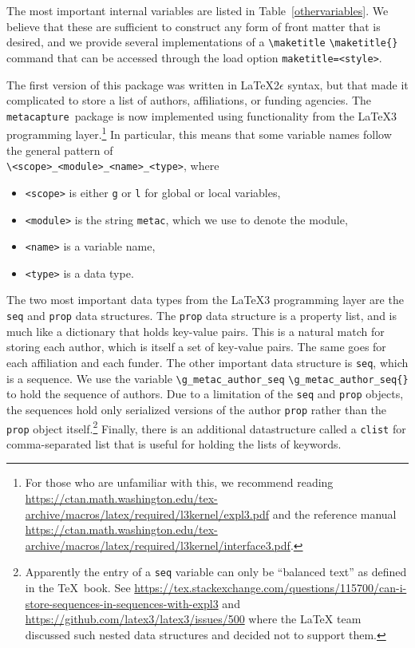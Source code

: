 \documentclass{article}
\newcommand{\pkgname}{\texttt{metacapture}}
\newcommand{\cmd}[2][]{%
  \def\FirstArg{#1}%
  \ifx\FirstArg\empty%
    \texttt{\textbackslash{}#2}%
  \else%
    \texttt{\textbackslash{}#2\{#1\}}%
  \fi
}
\begin{document}
The most important internal variables are listed in
Table~\ref{othervariables}. We believe that these are sufficient to
construct any form of front matter that is desired, and we provide
several implementations of a \cmd{maketitle} command that can be
accessed through the load
option \texttt{maketitle=\textless{style}\textgreater}. 

The first version of this package was written in LaTeX2$\epsilon$
syntax, but that made it complicated to store a list of authors,
affiliations, or funding agencies.  The \pkgname\ package is now
implemented using functionality from the LaTeX3 programming
layer.\footnote{For those who are unfamiliar with this, we recommend
reading \url{https://ctan.math.washington.edu/tex-archive/macros/latex/required/l3kernel/expl3.pdf}
and the reference
manual \url{https://ctan.math.washington.edu/tex-archive/macros/latex/required/l3kernel/interface3.pdf}.}
In particular, this means that some variable names follow the
general pattern of\\
\texttt{\textbackslash\textless{scope}\textgreater\_\textless{module}\textgreater\_\textless{name}\textgreater\_\textless{type}\textgreater},
where
\begin{itemize}
\setlength\itemsep{0pt}
\item \texttt{\textless{scope}\textgreater} is either \texttt{g} or \texttt{l} for global or local variables,
\item \texttt{\textless{module}\textgreater} is the string \texttt{metac}, which we use to denote the module,
\item \texttt{\textless{name}\textgreater} is a variable name,
\item \texttt{\textless{type}\textgreater} is a data type.
\end{itemize}
The two most important data types from the LaTeX3 programming layer
are the \texttt{seq} and \texttt{prop} data
structures. The \texttt{prop} data structure is a property list, and
is much like a dictionary that holds key-value pairs.  This is a
natural match for storing each author, which is itself a set of
key-value pairs.  The same goes for each affiliation and each funder.
The other important data structure is \texttt{seq}, which is a
sequence. We use the variable
\cmd{g\_metac\_author\_seq} to hold the sequence of authors.
Due to a limitation of the \texttt{seq} and \texttt{prop} objects, the
sequences hold only serialized versions of the author \texttt{prop}
rather than the \texttt{prop} object itself.\footnote{Apparently the
entry of a \texttt{seq} variable can only be ``balanced text'' as
defined in the \TeX\ book.
See \url{https://tex.stackexchange.com/questions/115700/can-i-store-sequences-in-sequences-with-expl3}
and \url{https://github.com/latex3/latex3/issues/500} where the LaTeX
team discussed such nested data structures and decided not to support them.}
Finally, there is an additional datastructure called a \texttt{clist}
for comma-separated list that is useful for holding the lists of
keywords.
\end{document}
